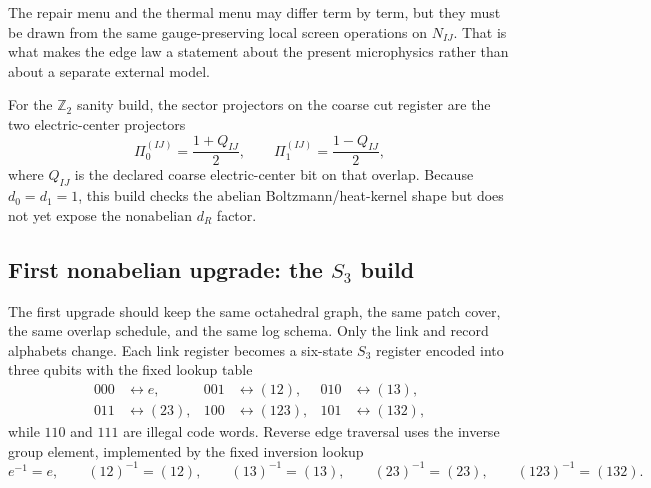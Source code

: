 \documentclass[11pt]{article}
\begin{document}
The repair menu and the thermal menu may differ term by term, but they must be drawn from
the same gauge-preserving local screen operations on $N_{IJ}$. That is what makes the edge law a
statement about the present microphysics rather than about a separate external model.

For the $\mathbb Z_2$ sanity build, the sector projectors on the coarse cut register are the two
electric-center projectors
\begin{equation}
\Pi_0^{(IJ)}=\frac{1+Q_{IJ}}{2},
\qquad
\Pi_1^{(IJ)}=\frac{1-Q_{IJ}}{2},
\end{equation}
where $Q_{IJ}$ is the declared coarse electric-center bit on that overlap. Because
$d_0=d_1=1$, this build checks the abelian Boltzmann/heat-kernel shape but does not yet expose
the nonabelian $d_R$ factor.

\subsection{First nonabelian upgrade: the $S_3$ build}

The first upgrade should keep the same octahedral graph, the same patch cover, the same overlap
schedule, and the same log schema. Only the link and record alphabets change. Each link register
becomes a six-state $S_3$ register encoded into three qubits with the fixed lookup table
\begin{align}
000&\leftrightarrow e, &
001&\leftrightarrow (12), &
010&\leftrightarrow (13),\\
011&\leftrightarrow (23), &
100&\leftrightarrow (123), &
101&\leftrightarrow (132),
\end{align}
while $110$ and $111$ are illegal code words. Reverse edge traversal uses the inverse group
element, implemented by the fixed inversion lookup
\begin{equation}
e^{-1}=e,\qquad (12)^{-1}=(12),\qquad (13)^{-1}=(13),\qquad (23)^{-1}=(23),\qquad
(123)^{-1}=(132).
\end{equation}
\end{document}
